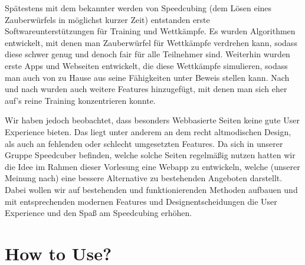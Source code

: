 \documentclass[a4paper]{article}
\theoremstyle{definition}
\begin{document}
Spätestens mit dem bekannter werden von Speedcubing (dem Lösen eines Zauberwürfels in möglichst kurzer Zeit)
entstanden erste Softwareunterstützungen für Training und Wettkämpfe. Es wurden Algorithmen entwickelt, mit denen
man Zauberwürfel für Wettkämpfe verdrehen kann, sodass diese schwer genug und denoch fair für alle Teilnehmer sind.
Weiterhin wurden erste Apps und Webseiten entwickelt, die diese Wettkämpfe simulieren, sodass man auch von zu
Hause aus seine Fähigkeiten unter Beweis stellen kann. Nach und nach wurden auch weitere Features hinzugefügt,
mit denen man sich eher auf's reine Training konzentrieren konnte.

Wir haben jedoch beobachtet, dass besonders Webbasierte Seiten keine gute User Experience bieten. Das liegt
unter anderem an dem recht altmodischen Design, als auch an fehlenden oder schlecht umgesetzten Features.
Da sich in unserer Gruppe Speedcuber befinden, welche solche Seiten regelmäßig nutzen hatten wir die Idee im
Rahmen dieser Vorlesung eine Webapp zu entwickeln, welche (unserer Meinung nach) eine bessere Alternative zu bestehenden
Angeboten darstellt. Dabei wollen wir auf bestehenden und funktionierenden Methoden aufbauen und mit entsprechenden
modernen Features und Designentscheidungen die User Experience und den Spaß am Speedcubing erhöhen.

\section{How to Use?}
\end{document}
